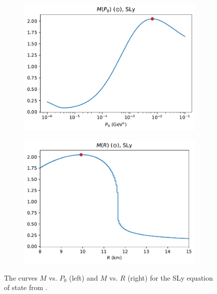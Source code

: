 \begin{figure}[h!]
    \centering
    \begin{subfigure}{.5\textwidth}
        \includegraphics[width=\textwidth]{images/tov/p0_analysis,SLy.pdf}
    \end{subfigure}%
    \begin{subfigure}{.5\textwidth}
        \includegraphics[width=\textwidth]{images/tov/r_analysis,SLy.pdf}
    \end{subfigure}
    \caption{The curves $M$ vs. $P_0$ (left) and $M$ vs. $R$ (right) for the SLy equation of state from \autocite{SLy_2004}.}
    \label{fig: tov, SLy mac curves}
\end{figure}

